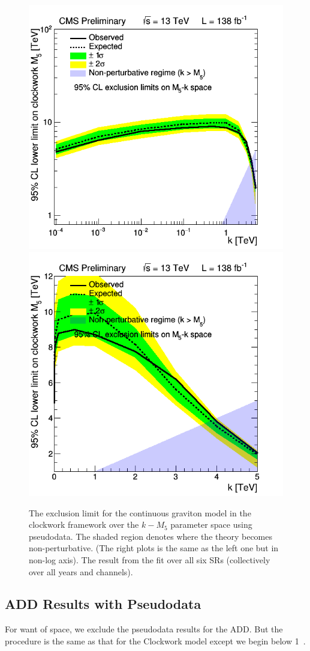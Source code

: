 \begin{spacing}{2}
\begin{figure}[h!]\centering
\includegraphics[width=0.49\linewidth]{fig/LIMITPLOT_BBBE161718_CWk.png}
\includegraphics[width=0.47\linewidth]{fig/LIMITPLOT_BBBE161718_CWk_nonLog.png}
\caption{The exclusion limit for the continuous graviton model in the clockwork framework over the $k-M_5$ parameter space using pseudodata.
The shaded region denotes where the theory becomes non-perturbative.
(The right plots is the same as the left one but in non-log axis).
The result from the fit over all six SRs (collectively over all years and channels).}
\label{Fig:LIMIT_Clockwork}
\end{figure}

\subsection{ADD Results with Pseudodata}

For want of space, we exclude the pseudodata results for the ADD. But the procedure is the same as that for the Clockwork model except we begin below 1~\TeV.
\end{spacing}